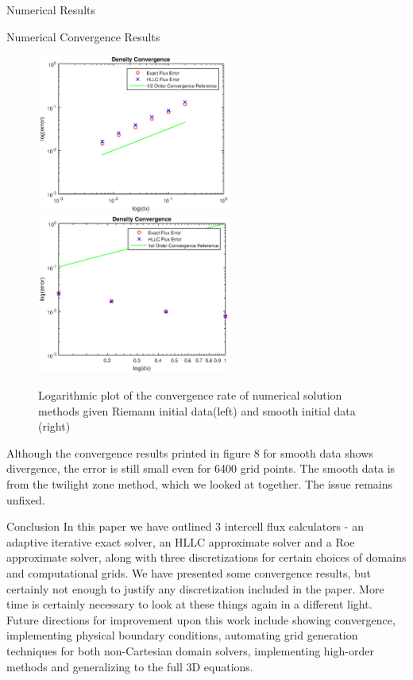 \begin{section}{Numerical Results}
\begin{subsection}{Numerical Convergence Results}
\begin{figure}[hb]
\centering
\includegraphics[width=2.5in]{eulerconv1}
\includegraphics[width=2.5in]{eulerconv2}
\caption{Logarithmic plot of the convergence rate of numerical solution methods given Riemann initial data(left) and smooth initial data (right)}
\end{figure}
Although the convergence results printed in figure 8 for smooth data shows divergence, the error is still small even for 6400 grid points. The smooth data is from the twilight zone method, which we looked at together. The issue remains unfixed.
\end{subsection}
\end{section}

\begin{section}{Conclusion}
In this paper we have outlined 3 intercell flux calculators - an adaptive iterative exact solver, an HLLC approximate solver and a Roe approximate solver, along with three discretizations for certain choices of domains and computational grids. We have presented some convergence results, but certainly not enough to justify any discretization included in the paper. More time is certainly necessary to look at these things again in a different light.\\
Future directions for improvement upon this work include showing convergence, implementing physical boundary conditions, automating grid generation techniques for both non-Cartesian domain solvers, implementing high-order methods and generalizing to the full 3D equations.
\end{section}

